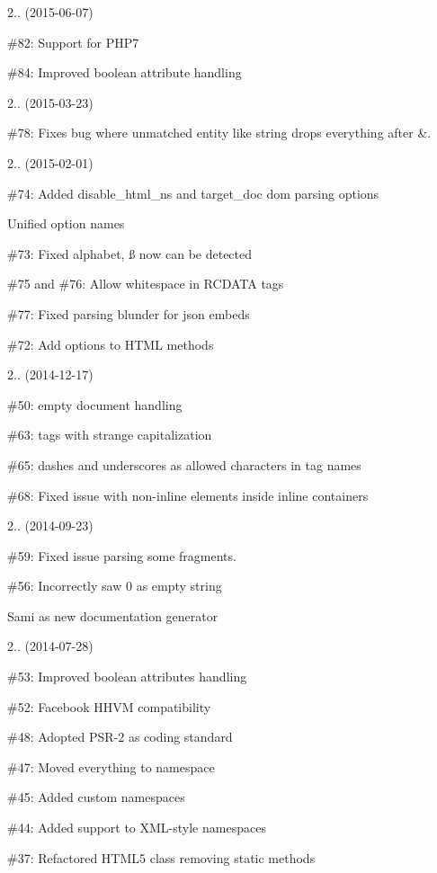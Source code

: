 2.. (2015-\/06-\/07)
\begin{DoxyItemize}
\item \#82\+: Support for PHP7
\item \#84\+: Improved boolean attribute handling
\end{DoxyItemize}

2.. (2015-\/03-\/23)
\begin{DoxyItemize}
\item \#78\+: Fixes bug where unmatched entity like string drops everything after \&.
\end{DoxyItemize}

2.. (2015-\/02-\/01)
\begin{DoxyItemize}
\item \#74\+: Added {\ttfamily disable\+\_\+html\+\_\+ns} and {\ttfamily target\+\_\+doc} dom parsing options
\item Unified option names
\item \#73\+: Fixed alphabet, {\ss} now can be detected
\item \#75 and \#76\+: Allow whitespace in RCDATA tags
\item \#77\+: Fixed parsing blunder for json embeds
\item \#72\+: Add options to HTML methods
\end{DoxyItemize}

2.. (2014-\/12-\/17)
\begin{DoxyItemize}
\item \#50\+: empty document handling
\item \#63\+: tags with strange capitalization
\item \#65\+: dashes and underscores as allowed characters in tag names
\item \#68\+: Fixed issue with non-\/inline elements inside inline containers
\end{DoxyItemize}

2.. (2014-\/09-\/23)
\begin{DoxyItemize}
\item \#59\+: Fixed issue parsing some fragments.
\item \#56\+: Incorrectly saw 0 as empty string
\item Sami as new documentation generator
\end{DoxyItemize}

2.. (2014-\/07-\/28)
\begin{DoxyItemize}
\item \#53\+: Improved boolean attributes handling
\item \#52\+: Facebook HHVM compatibility
\item \#48\+: Adopted PSR-\/2 as coding standard
\item \#47\+: Moved everything to  namespace
\item \#45\+: Added custom namespaces
\item \#44\+: Added support to XML-\/style namespaces
\item \#37\+: Refactored HTML5 class removing static methods
\end{DoxyItemize}

